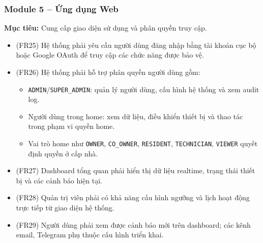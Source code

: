 \subsubsection{Module 5 – Ứng dụng Web}

\textbf{Mục tiêu:} Cung cấp giao diện sử dụng và phân quyền truy cập.

\begin{itemize}
    \item (FR25) Hệ thống phải yêu cầu người dùng đăng nhập bằng tài khoản cục bộ hoặc Google OAuth để truy cập các chức năng được bảo vệ.
    
    \item (FR26) Hệ thống phải hỗ trợ phân quyền người dùng gồm:
    \begin{itemize}
        \item \texttt{ADMIN}/\texttt{SUPER\_ADMIN}: quản lý người dùng, cấu hình hệ thống và xem audit log.
        \item Người dùng trong home: xem dữ liệu, điều khiển thiết bị và thao tác trong phạm vi quyền home.
        \item Vai trò home như \texttt{OWNER}, \texttt{CO\_OWNER}, \texttt{RESIDENT}, \texttt{TECHNICIAN}, \texttt{VIEWER} quyết định quyền ở cấp nhà.
    \end{itemize}
    
    \item (FR27) Dashboard tổng quan phải hiển thị dữ liệu realtime, trạng thái thiết bị và các cảnh báo hiện tại.
    
    \item (FR28) Quản trị viên phải có khả năng cấu hình ngưỡng và lịch hoạt động trực tiếp từ giao diện hệ thống.
    
    \item (FR29) Người dùng phải xem được cảnh báo mới trên dashboard; các kênh email, Telegram phụ thuộc cấu hình triển khai.
\end{itemize}


